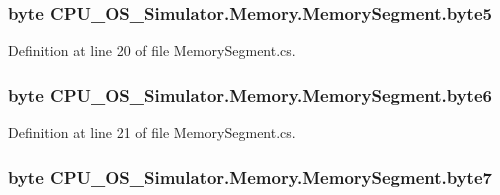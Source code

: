 \subsubsection[{byte5}]{\setlength{\rightskip}{0pt plus 5cm}byte C\+P\+U\+\_\+\+O\+S\+\_\+\+Simulator.\+Memory.\+Memory\+Segment.\+byte5\hspace{0.3cm}{\ttfamily [private]}}\label{class_c_p_u___o_s___simulator_1_1_memory_1_1_memory_segment_a6d35dbdcd3428e9a1869fda265341123}


Definition at line 20 of file Memory\+Segment.\+cs.

\hypertarget{class_c_p_u___o_s___simulator_1_1_memory_1_1_memory_segment_a242f25c3861a3c0d1d51484203ea8603}{}
\subsubsection[{byte6}]{\setlength{\rightskip}{0pt plus 5cm}byte C\+P\+U\+\_\+\+O\+S\+\_\+\+Simulator.\+Memory.\+Memory\+Segment.\+byte6\hspace{0.3cm}{\ttfamily [private]}}\label{class_c_p_u___o_s___simulator_1_1_memory_1_1_memory_segment_a242f25c3861a3c0d1d51484203ea8603}


Definition at line 21 of file Memory\+Segment.\+cs.

\hypertarget{class_c_p_u___o_s___simulator_1_1_memory_1_1_memory_segment_af4a4ab7c802e0a5b5f3684c0cfac5f80}{}
\subsubsection[{byte7}]{\setlength{\rightskip}{0pt plus 5cm}byte C\+P\+U\+\_\+\+O\+S\+\_\+\+Simulator.\+Memory.\+Memory\+Segment.\+byte7\hspace{0.3cm}{\ttfamily [private]}}\label{class_c_p_u___o_s___simulator_1_1_memory_1_1_memory_segment_af4a4ab7c802e0a5b5f3684c0cfac5f80}


